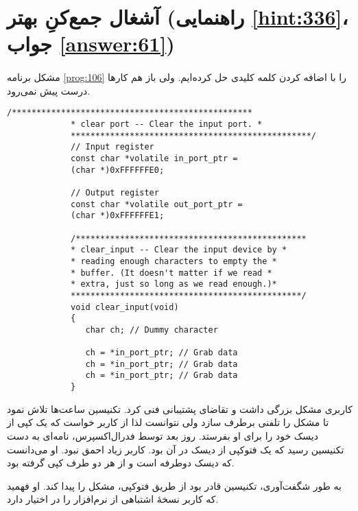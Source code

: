 \section[آشغال جمع‌کنِ بهتر]{آشغال جمع‌کنِ بهتر (راهنمایی \ref{hint:336}، جواب \ref{answer:61})}
\paragraph{}\label{prog:107}
مشکل برنامه \ref{prog:106} را با اضافه کردن کلمه کلیدی  حل کرده‌ایم. ولی باز هم کارها درست پیش نمی‌رود.

\begin{LTR}
        \begin{lstlisting}[style=C++Style]
             /*************************************************
             * clear port -- Clear the input port. *
             *************************************************/
             // Input register
             const char *volatile in_port_ptr =
             (char *)0xFFFFFFE0;

             // Output register
             const char *volatile out_port_ptr =
             (char *)0xFFFFFFE1;

             /***********************************************
             * clear_input -- Clear the input device by *
             * reading enough characters to empty the *
             * buffer. (It doesn't matter if we read *
             * extra, just so long as we read enough.)*
             ***********************************************/
             void clear_input(void)
             {
             	char ch; // Dummy character

             	ch = *in_port_ptr; // Grab data
             	ch = *in_port_ptr; // Grab data
             	ch = *in_port_ptr; // Grab data
             }
        \end{lstlisting}
\end{LTR}

\begin{tcolorbox}
    کاربری مشکل بزرگی داشت و تقاضای پشتیبانی فنی کرد. تکنیسین ساعت‌ها تلاش نمود تا مشکل را تلفنی برطرف سازد ولی نتوانست لذا از کاربر خواست که یک کپی از دیسک خود را برای او بفرستد. روز بعد توسط فدرال‌اکسپرس، نامه‌ای به دست تکنیسین رسید که یک فتوکپی از دیسک در آن بود. کاربر زیاد احمق نبود. او می‌دانست که دیسک دوطرفه است و از هر دو طرف کپی گرفته بود.

    به طور شگفت‌آوری، تکنیسین قادر بود از طریق فتوکپی، مشکل را پیدا کند. او فهمید که کاربر نسخهٔ اشتباهی از نرم‌افزار را در اختیار دارد.
\end{tcolorbox}